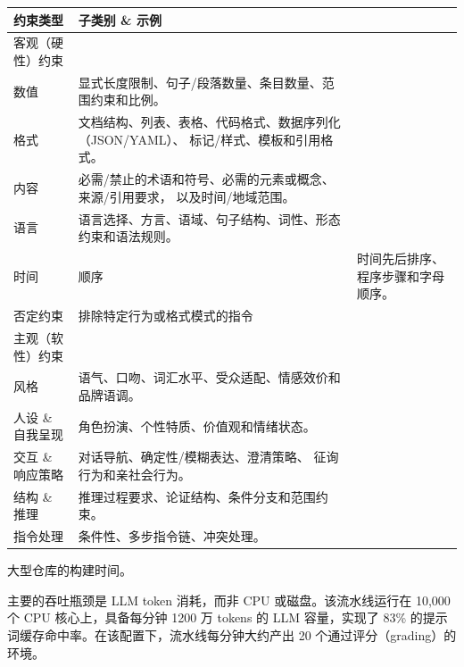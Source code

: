 {\def\LTcaptype{none} %
\begin{longtable}[]{@{}|l|l|@{}}
\toprule\noalign{}
\endhead
\bottomrule\noalign{}
\endlastfoot
\hline
约束类型 & 子类别 \& 示例 \\
\hline
客观（硬性）约束 & \\
\hline
数值 & 显式长度限制、句子/段落数量、条目数量、范围约束和比例。 \\
\hline
格式 & 文档结构、列表、表格、代码格式、数据序列化（JSON/YAML）、
标记/样式、模板和引用格式。 \\
\hline
内容 & 必需/禁止的术语和符号、必需的元素或概念、来源/引用要求，
以及时间/地域范围。 \\
\hline
语言 & 语言选择、方言、语域、句子结构、词性、形态约束和语法规则。 \\
\hline
时间 & 顺序 & 时间先后排序、程序步骤和字母顺序。 \\
\hline
否定约束 & 排除特定行为或格式模式的指令 \\
\hline
主观（软性）约束 & \\
\hline
风格 & 语气、口吻、词汇水平、受众适配、情感效价和品牌语调。 \\
\hline
人设 \& 自我呈现 & 角色扮演、个性特质、价值观和情绪状态。 \\
\hline
交互 \& 响应策略 & 对话导航、确定性/模糊表达、澄清策略、
征询行为和亲社会行为。 \\
\hline
结构 \& 推理 & 推理过程要求、论证结构、条件分支和范围约束。 \\
\hline
指令处理 & 条件性、多步指令链、冲突处理。 \\
\hline
\end{longtable}
}

大型仓库的构建时间。

主要的吞吐瓶颈是 LLM token 消耗，而非 CPU 或磁盘。该流水线运行在 10,000 个 CPU 核心上，具备每分钟 1200 万 tokens 的 LLM 容量，实现了 83\% 的提示词缓存命中率。在该配置下，流水线每分钟大约产出 20 个通过评分（grading）的环境。
